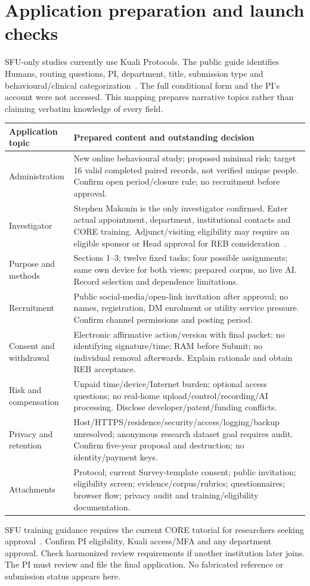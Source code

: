 \documentclass[11pt,letterpaper]{article}
\begin{document}
\section{Application preparation and launch checks}
SFU-only studies currently use Kuali Protocols. The public guide identifies Humans, routing questions, PI, department, title, submission type and behavioural/clinical categorization~\cite{sfu-kuali}. The full conditional form and the PI's account were not accessed. This mapping prepares narrative topics rather than claiming verbatim knowledge of every field.
\begin{longtable}{L{3.5cm}L{11.0cm}}
\toprule
Application topic & Prepared content and outstanding decision\\
\midrule
\endhead
Administration & New online behavioural study; proposed minimal risk; target 16 valid completed paired records, not verified unique people. Confirm open period/closure rule; no recruitment before approval.\\
Investigator & Stephen Makonin is the only investigator confirmed. Enter actual appointment, department, institutional contacts and CORE training. Adjunct/visiting eligibility may require an eligible sponsor or Head approval for REB consideration~\cite{sfu-pi}.\\
Purpose and methods & Sections 1--3; twelve fixed tasks; four possible assignments; same own device for both views; prepared corpus, no live AI. Record selection and dependence limitations.\\
Recruitment & Public social-media/open-link invitation after approval; no names, registration, DM enrolment or utility service pressure. Confirm channel permissions and posting period.\\
Consent and withdrawal & Electronic affirmative action/version with final packet; no identifying signature/time; RAM before Submit; no individual removal afterwards. Explain rationale and obtain REB acceptance.\\
Risk and compensation & Unpaid time/device/Internet burden; optional access questions; no real-home upload/control/recording/AI processing. Disclose developer/patent/funding conflicts.\\
Privacy and retention & Host/HTTPS/residence/security/access/logging/backup unresolved; anonymous research dataset goal requires audit. Confirm five-year proposal and destruction; no identity/payment keys.\\
Attachments & Protocol; current Survey-template consent; public invitation; eligibility screen; evidence/corpus/rubrics; questionnaires; browser flow; privacy audit and training/eligibility documentation.\\
\bottomrule
\end{longtable}
SFU training guidance requires the current CORE tutorial for researchers seeking approval~\cite{sfu-training}. Confirm PI eligibility, Kuali access/MFA and any department approval. Check harmonized review requirements if another institution later joins. The PI must review and file the final application. No fabricated reference or submission status appears here.
\end{document}
